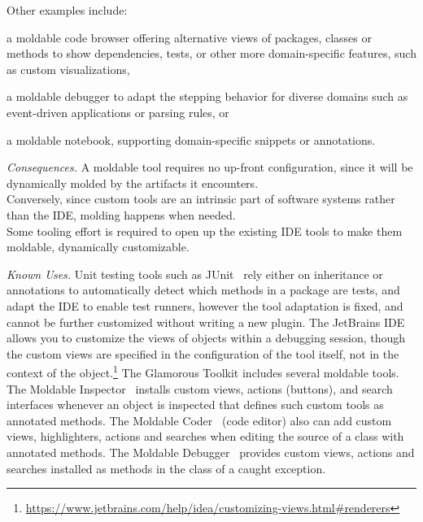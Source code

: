 \documentclass[sigconf,screen]{acmart}
\newcommand\cp[1]{\nbe{Cesare}{#1}{olive}} %
\newcommand\ws[1]{\nbe{Workshop}{#1}{teal}} %
\newcommand{\patsec}[1]{\noindent\textit{#1.}\xspace}
\begin{document}
Other examples include:
\begin{inparaenum}[(i)]
\item a moldable code browser offering alternative views of packages, classes or methods to show dependencies, tests, or other more domain-specific features, such as custom visualizations,
\item a moldable debugger to adapt the stepping behavior for diverse domains such as event-driven applications or parsing rules, 
or
\item a moldable notebook, supporting domain-specific snippets or annotations.
\end{inparaenum}

\patsec{Consequences}
A moldable tool requires no up-front configuration, since it will be dynamically molded by the artifacts it encounters.\\
Conversely, since custom tools are an intrinsic part of software systems rather than the IDE, molding happens when needed.\\
Some tooling effort is required to open up the existing IDE tools to make them moldable, \ie dynamically customizable.


\patsec{Known Uses}
Unit testing tools such as JUnit~\cite{Beck98a} rely either on inheritance or annotations to automatically detect which methods in a package are tests, and adapt the IDE to enable test runners, however the tool adaptation is fixed, and cannot be further customized without writing a new plugin.
The JetBrains IDE allows you to customize the views of objects within a debugging session, though the custom views are specified in the configuration of the tool itself, not in the context of the object.\footnote{\href{https://web.archive.org/web/20240523010248/https://www.jetbrains.com/help/idea/customizing-views.html\#renderers}{https://www.jetbrains.com/help/idea/customizing-views.html\#renderers}}
The Glamorous Toolkit includes several moldable tools.
The Moldable Inspector~\cite{Chis14a} installs custom views, actions (\ie buttons), and search interfaces whenever an object is inspected that defines such custom tools as annotated methods.
The Moldable Coder~\cite{Syre17a} (\ie code editor) also can add custom views, highlighters, actions and searches when editing the source of a class with annotated methods.
The Moldable Debugger~\cite{Chis24a} provides custom views, actions and searches installed as methods in the class of a caught exception.
\end{document}
